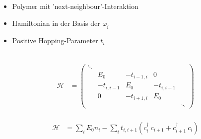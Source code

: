 \begin{frame}
\begin{minipage}{.39\textwidth}
	\begin{itemize}
		\setlength\itemsep{1cm}
		\item Polymer mit 'next-neighbour'-Interaktion
		\item Hamiltonian in der Basis der $\varphi_i$
		\item Positive Hopping-Parameter $t_i$
	\end{itemize}
\end{minipage}
\begin{minipage}{0.6\textwidth}
\centering
{}
\\
\begin{align*}
\mathcal{H} &= \begin{pmatrix*}
\ddots&&&\\
&E_{0}&-t_{i-1, i}&0\\
&-t_{i, i-1}&E_0&-t_{i, i+1}\\
&0&-t_{i+1, i}&E_{0}&\\
&&&&\ddots
\end{pmatrix*}
\end{align*}
\\
\begin{align*}
	\mathcal{H} &= \sum_i E_0 n_i - \sum_i t_{i, i+1} \left(c_i^\dagger\  c_{i+1} + c_{i+1}^\dagger\  c_i\right)
\end{align*}
\end{minipage}
\end{frame}

